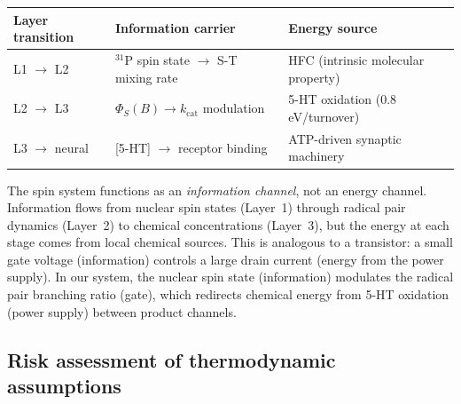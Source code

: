 \documentclass[11pt]{article}
\begin{document}
\begin{center}
\begin{tabular}{lll}
\toprule
Layer transition & Information carrier & Energy source \\
\midrule
L1 $\to$ L2 & $^{31}$P spin state $\to$ S-T mixing rate & HFC (intrinsic molecular property) \\
L2 $\to$ L3 & $\Phi_S(B) \to k_\mathrm{cat}$ modulation & 5-HT oxidation (0.8 eV/turnover) \\
L3 $\to$ neural & {[5-HT]} $\to$ receptor binding & ATP-driven synaptic machinery \\
\bottomrule
\end{tabular}
\end{center}

The spin system functions as an \emph{information channel}, not an energy channel. Information flows from nuclear spin states (Layer~1) through radical pair dynamics (Layer~2) to chemical concentrations (Layer~3), but the energy at each stage comes from local chemical sources. This is analogous to a transistor: a small gate voltage (information) controls a large drain current (energy from the power supply). In our system, the nuclear spin state (information) modulates the radical pair branching ratio (gate), which redirects chemical energy from 5-HT oxidation (power supply) between product channels.

\subsection{Risk assessment of thermodynamic assumptions}
\end{document}
